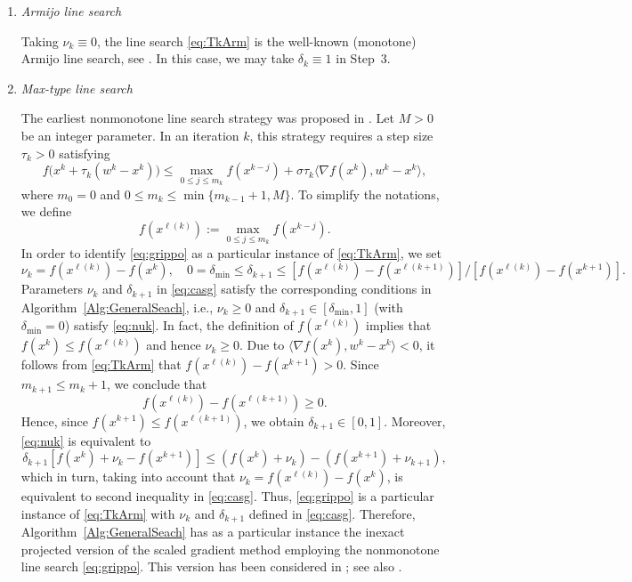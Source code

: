 \begin{enumerate}
	\item {\it Armijo line search}

	      Taking  $\nu_k\equiv 0$, the line search   \eqref{eq:TkArm}  is the well-known (monotone) Armijo line search, see \cite[Section 2.3]{Bertsekas1999}. In this case, we  may take  $\delta_k\equiv 1$ in Step~3.

	\item {\it Max-type line search}

	      The earliest nonmonotone line search strategy  was proposed  in \cite{Grippo1986}. Let $M>0$ be an integer parameter. In an iteration $k$, this strategy requires a step size $\tau_k>0$ satisfying
	      \begin{equation}\label{eq:grippo}
		      f\big(x^{k}+ \tau_k(w^k - x^{k})\big) \leq \max_{0\leq j\leq m_k}f(x^{k-j}) + \sigma \tau_k\big\langle \nabla f(x^{k}), w^k - x^{k} \big\rangle,
	      \end{equation}
	      where $m_0=0$ and $0\leq m_k\leq \min\{m_{k-1}+1, M\}$.  To simplify the notations,  we define $$f(x^{\ell(k)}):=\max_{0\leq j\leq m_k}f(x^{k-j}).$$  In order to identify \eqref{eq:grippo} as a particular instance of \eqref{eq:TkArm}, we  set
	      \begin{equation} \label{eq:casg}
		      \nu_{k}= f(x^{\ell(k)})-f(x^k), \quad 0=\delta_{\min}\leq \delta_{k+1}\leq  [f(x^{\ell(k)})- f(x^{\ell(k+1)})]/[f(x^{\ell(k)})-f(x^{k+1})].
	      \end{equation}
	      Parameters $\nu_{k}$ and $\delta_{k+1}$ in \eqref{eq:casg} satisfy the corresponding conditions in Algorithm~\ref{Alg:GeneralSeach}, i.e.,  $\nu_{k} \geq 0$ and  $\delta_{k+1}\in [\delta_{\min}, 1]$ (with   $\delta_{\min}=0$)  satisfy \eqref{eq:nuk}.  In fact, the definition of $f(x^{\ell(k)})$ implies that   $ f(x^{k})\leq f(x^{\ell(k)})$ and hence $\nu_{k} \geq 0$.  Due to  $\langle \nabla f(x^{k}), w^k - x^{k} \rangle<0$,   it follows from  \eqref{eq:TkArm} that $f(x^{\ell(k)})-f(x^{k+1})>0$. Since   $m_{k+1}\leq m_{k}+1$, we conclude that  $$f(x^{\ell(k)})-f(x^{\ell(k+1)}) \geq 0.$$
	      Hence, since $ f(x^{k+1})\leq f(x^{\ell(k+1)})$, we obtain $\delta_{k+1}\in [0, 1]$.  Moreover,  \eqref{eq:nuk} is equivalent  to
	      $$
		      \delta_{k+1}[f(x^{k})+\nu_{k}-f(x^{k+1})] \leq(f(x^{k})+\nu_{k}) -  (f(x^{k+1})+ \nu_{k+1}),
	      $$
	      which in turn, taking into account  that $\nu_{k}= f(x^{\ell(k)})-f(x^k)$, is equivalent to second inequality in \eqref{eq:casg}. Thus, \eqref{eq:grippo} is a particular instance of \eqref{eq:TkArm} with  $\nu_{k}$ and $\delta_{k+1}$ defined in \eqref{eq:casg}.  Therefore,  Algorithm~\ref{Alg:GeneralSeach} has as a particular instance the  inexact   projected  version of the scaled gradient method employing   the nonmonotone line search  \eqref{eq:grippo}. This version has been considered in \cite{BirginMartinezRaydan2003}; see also  \cite{Bonettini2009, WangLiu2005}.



\end{enumerate}
